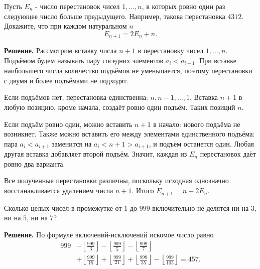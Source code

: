 \begin{problems}
\item Пусть $E_n$ - число перестановок чисел $1,\ldots,n$, в которых ровно один раз следующее число больше предыдущего. Например, такова перестановка $4312$. Докажите, что при каждом натуральном $n$
\[
E_{n+1}=2E_n+n.
\]
\par\smallskip\noindent\textbf{Решение.} Рассмотрим вставку числа $n+1$ в перестановку чисел $1,\ldots,n$. Подъёмом будем называть пару соседних элементов $a_i<a_{i+1}$. При вставке наибольшего числа количество подъёмов не уменьшается, поэтому перестановки с двумя и более подъёмами не подходят.
\par Если подъёмов нет, перестановка единственна: $n,n-1,\ldots,1$. Вставка $n+1$ в любую позицию, кроме начала, создаёт ровно один подъём. Таких позиций $n$.
\par Если подъём ровно один, можно вставить $n+1$ в начало: нового подъёма не возникнет. Также можно вставить его между элементами единственного подъёма: пара $a_i<a_{i+1}$ заменится на $a_i<n+1>a_{i+1}$, и подъём останется один. Любая другая вставка добавляет второй подъём. Значит, каждая из $E_n$ перестановок даёт ровно два варианта.
\par Все полученные перестановки различны, поскольку исходная однозначно восстанавливается удалением числа $n+1$. Итого $E_{n+1}=n+2E_n$.\par

\item Сколько целых чисел в промежутке от $1$ до $999$ включительно не делятся ни на $3$, ни на $5$, ни на $7$?
\par\smallskip\noindent\textbf{Решение.} По формуле включений-исключений искомое число равно
\[
\begin{aligned}
999
&-\left\lfloor\frac{999}{3}\right\rfloor
-\left\lfloor\frac{999}{5}\right\rfloor
-\left\lfloor\frac{999}{7}\right\rfloor\\
&+\left\lfloor\frac{999}{15}\right\rfloor
+\left\lfloor\frac{999}{21}\right\rfloor
+\left\lfloor\frac{999}{35}\right\rfloor
-\left\lfloor\frac{999}{105}\right\rfloor
=457.
\end{aligned}
\]\par


\end{problems}
